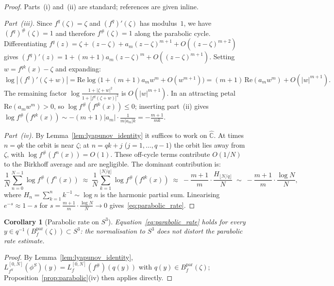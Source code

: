 \documentclass[12pt]{article}
\newtheorem{corollary}[theorem]{Corollary}
\theoremstyle{definition}
\newcommand{\C}{\mathbb{C}}
\newcommand{\Chat}{\hat{\C}}
\newcommand{\fsh}{f^{\#}}            %
\begin{document}
\begin{proof}
  Parts~(i) and~(ii) are standard; references are given inline.

  \textit{Part~(iii).}
  Since $f^q(\zeta)=\zeta$ and $(f^q)'(\zeta)$ has modulus~$1$, we have
  $(f^q)^{\#}(\zeta)=1$ and therefore $\fsh(\zeta)=1$ along the parabolic
  cycle.  Differentiating
  $f^q(z)=\zeta+(z-\zeta)+a_m(z-\zeta)^{m+1}+O((z-\zeta)^{m+2})$
  gives $(f^q)'(z)=1+(m+1)a_m(z-\zeta)^m+O((z-\zeta)^{m+1})$.
  Setting $w=f^{qk}(x)-\zeta$ and expanding:
  \[
    \log|(f^q)'(\zeta+w)|
    = \mathrm{Re}\log\bigl(1+(m+1)a_mw^m+O(w^{m+1})\bigr)
    = (m+1)\,\mathrm{Re}(a_mw^m)+O(|w|^{m+1}).
  \]
  The remaining factor $\log\tfrac{1+|\zeta+w|^2}{1+|f^q(\zeta+w)|^2}$
  is $O(|w|^{m+1})$.  In an attracting petal $\mathrm{Re}(a_mw^m)>0$, so
  $\log\fsh(f^{qk}(x))\le 0$; inserting part~(ii) gives
  $\log\fsh(f^{qk}(x))\sim-(m+1)|a_m|\cdot\frac{1}{m|a_m|k}
  =-\frac{m+1}{mk}$.

  \textit{Part~(iv).}
  By Lemma~\ref{lem:lyapunov_identity} it suffices to work on $\Chat$.
  At times $n=qk$ the orbit is near $\zeta$; at $n=qk+j$ ($j=1,\ldots,q-1$)
  the orbit lies away from $\zeta$, with $\log\fsh(f^n(x))=O(1)$.
  These off-cycle terms contribute $O(1/N)$ to the Birkhoff average and
  are negligible.  The dominant contribution is:
  \[
    \frac{1}{N}\sum_{n=0}^{N-1}\log\fsh(f^n(x))
    \;\approx\;
    \frac{1}{N}\sum_{k=1}^{\lfloor N/q\rfloor}\log\fsh(f^{qk}(x))
    \;\approx\;
    -\frac{m+1}{m}\cdot\frac{H_{\lfloor N/q\rfloor}}{N}
    \;\sim\;
    -\frac{m+1}{m}\cdot\frac{\log N}{N},
  \]
  where $H_n=\sum_{k=1}^n k^{-1}\sim\log n$ is the harmonic partial sum.
  Linearising $e^{-s}\approx 1-s$ for
  $s=\frac{m+1}{m}\cdot\frac{\log N}{N}\to 0$
  gives~\eqref{eq:parabolic_rate}.
\end{proof}

\begin{corollary}[Parabolic rate on $S^3$]\label{cor:parabolic_hopf}
  Equation~\eqref{eq:parabolic_rate} holds for every
  $y\in q^{-1}(B_f^{\mathrm{par}}(\zeta))\subset S^3$:
  the normalisation to $S^3$ does not distort the parabolic rate estimate.
\end{corollary}

\begin{proof}
  By Lemma~\ref{lem:lyapunov_identity},
  $L_{f^S}^{[0,N]}(\phi^S)(y)=L_f^{[0,N]}(\fsh)(q(y))$
  with $q(y)\in B_f^{\mathrm{par}}(\zeta)$;
  Proposition~\ref{prop:parabolic}(iv) then applies directly.
\end{proof}
\end{document}
